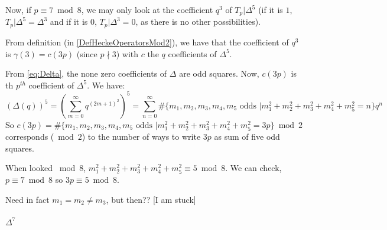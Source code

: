 Now, if $p \equiv 7 \bmod 8$, we may only look at the coefficient $q^3$ of $T_p|\Delta^5$ (if it is $1$, $T_p|\Delta^5 = \Delta^3$ and if it is $0$, $T_p|\Delta^3 = 0$, as there is no other possibilities).

From definition (in \ref{DefHeckeOperatorsMod2}), we have that the coefficient of $q^3$ is $\gamma(3) = c(3p)$ (since $p \nmid 3$) with $c$ the $q$ coefficients of $\Delta^5$.

From \eqref{eq:Delta}, the none zero coefficients of $\Delta$ are odd squares.
Now, $c(3p)$ is th $p^{th}$ coefficient of $\Delta^5$. We have:
$$
\left( \Delta(q) \right)^5
= \left( \sum_{m=0}^{\infty} q^{(2m+1)^2} \right)^5
= \sum_{n=0}^{\infty} \#\{m_1, m_2, m_3, m_4, m_5 \text{ odds } | m_1^2 + m_2^2 + m_3^2 + m_4^2 + m_5^2 = n\} q^n
$$
So $c(3p) = \#\{m_1, m_2, m_3, m_4, m_5 \text{ odds } | m_1^2 + m_2^2 + m_3^2 + m_4^2 + m_5^2 = 3p\} \bmod 2$ corresponds ($\bmod 2$) to the number of ways to write $3p$ as sum of five odd squares.

When looked $\bmod 8$, $m_1^2 + m_2^2 + m_3^2 + m_4^2 + m_5^2 \equiv 5 \bmod 8$.
We can check, $p \equiv 7 \bmod 8$ so $3p \equiv 5 \bmod 8$.







Need in fact $m_1 = m_2 \neq m_3$, but then??
[I am stuck]






\paragraph{$\Delta^7$}


